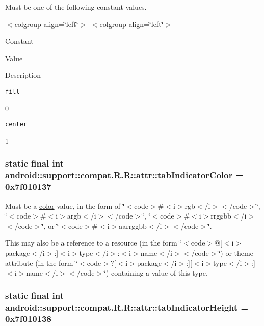 Must be one of the following constant values. \begin{TabularC}{0}
\hline
\end{TabularC}
$<$colgroup align=\char`\"{}left\char`\"{}$>$ $<$colgroup align=\char`\"{}left\char`\"{}$>$ 

Constant

Value

Description 

{\tt fill}

0

{\tt center}

1\hypertarget{classandroid_1_1support_1_1compat_1_1_r_1_1attr_41ae1428106be641f8e4ecafc0da2fef}{
\subsubsection[{tabIndicatorColor}]{\setlength{\rightskip}{0pt plus 5cm}static final int android::support::compat.R.R::attr::tabIndicatorColor = 0x7f010137}}
\label{classandroid_1_1support_1_1compat_1_1_r_1_1attr_41ae1428106be641f8e4ecafc0da2fef}


Must be a \hyperlink{classandroid_1_1support_1_1compat_1_1_r_1_1color}{color} value, in the form of \char`\"{}$<$code$>$\#$<$i$>$rgb$<$/i$>$$<$/code$>$\char`\"{}, \char`\"{}$<$code$>$\#$<$i$>$argb$<$/i$>$$<$/code$>$\char`\"{}, \char`\"{}$<$code$>$\#$<$i$>$rrggbb$<$/i$>$$<$/code$>$\char`\"{}, or \char`\"{}$<$code$>$\#$<$i$>$aarrggbb$<$/i$>$$<$/code$>$\char`\"{}. 

This may also be a reference to a resource (in the form \char`\"{}$<$code$>$@\mbox{[}$<$i$>$package$<$/i$>$:\mbox{]}$<$i$>$type$<$/i$>$:$<$i$>$name$<$/i$>$$<$/code$>$\char`\"{}) or theme attribute (in the form \char`\"{}$<$code$>$?\mbox{[}$<$i$>$package$<$/i$>$:\mbox{]}\mbox{[}$<$i$>$type$<$/i$>$:\mbox{]}$<$i$>$name$<$/i$>$$<$/code$>$\char`\"{}) containing a value of this type. \hypertarget{classandroid_1_1support_1_1compat_1_1_r_1_1attr_db7a7bb2a732cacb13e19dfd8762c965}{
\subsubsection[{tabIndicatorHeight}]{\setlength{\rightskip}{0pt plus 5cm}static final int android::support::compat.R.R::attr::tabIndicatorHeight = 0x7f010138}}
\label{classandroid_1_1support_1_1compat_1_1_r_1_1attr_db7a7bb2a732cacb13e19dfd8762c965}


